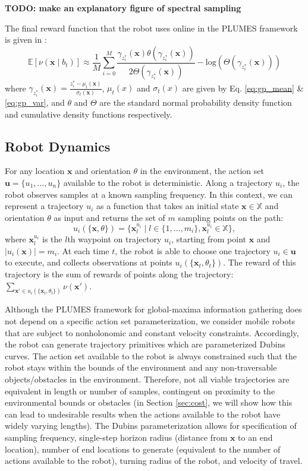 \documentclass{styles/svproc}
\newcommand{\x}{\mathbf{x}}
\newcommand{\U}{\mathbf{u}}
\begin{document}
\textbf{TODO: make an explanatory figure of spectral sampling}

The final reward function that the robot uses online in the PLUMES framework is given in \cite{wang2017max}:
\begin{equation}
    \mathbb{E}[\nu(\x \mid  b_t)] \approx \frac{1}{M} \sum_{i = 0}^M  \frac{\gamma_{z_i^*}(\x) \theta(\gamma_{z_i^*}(\x))}{2 \Theta(\gamma_{z_i^*}(\x))}-\text{log}(\Theta(\gamma_{z_i^*}(\x)))
\end{equation}
where $\gamma_{z_i^*}(\x) = \frac{z_i^* - \mu_t(\x)}{\sigma_t(\x)}$, $\mu_t(x)$ and $\sigma_t(x)$ are given by Eq. \ref{eq:gp_mean} \& \ref{eq:gp_var}, and $\theta$ and $\Theta$ are the standard normal probability density function and cumulative density functions respectively.


\subsection{Robot Dynamics}
\label{sec:planning}
For any location $\x$ and orientation $\theta$ in the environment, the action set $\U = \{u_1, \dots, u_n\}$ available to the robot is deterministic. Along a trajectory $u_i$, the robot observes samples at a known sampling frequency. In this context, we can represent a trajectory $u_i$ as a function that takes an initial state $\x \in \mathbb{X}$ and orientation $\theta$ as input and returns the set of $m$ sampling points on the path:
\begin{equation}
u_i(\{\x, \theta\}) = \{\x_{l}^{u_i} \mid l \in \{1, \dots, m_i\}, \x_{l}^{u_i}  \in \mathbb{X}\},    
\end{equation} 
where $\x_{l}^{u_i}$ is the $l$th waypoint on trajectory $u_i$, starting from point $\x$ and $|u_i(\x)| = m_i$. At each time $t$, the robot is able to choose one trajectory $u_i \in \U$ to execute, and collects observations at points $u_i(\{\x_t, \theta_t\})$. The reward of this trajectory is the sum of rewards of points along the trajectory: $\sum_{\x' \in u_i(\{\x_t, \theta_t\})} \nu(\x')$. %


Although the PLUMES framework for global-maxima information gathering does not depend on a specific action set parameterization, we consider mobile robots that are subject to nonholonomic and constant velocity constraints. Accordingly, the robot can generate trajectory primitives which are parameterized Dubins curves.  The action set available to the robot is always constrained such that the robot stays within the bounds of the environment and any non-traversable objects/obstacles in the environment. Therefore, not all viable trajectories are equivalent in length or number of samples, contingent on proximity to the environmental bounds or obstacles (in Section \ref{sec:cost}, we will show how this can lead to undesirable results when the actions available to the robot have widely varying lengths). The Dubins parameterization allows for specification of sampling frequency, single-step horizon radius (distance from $\x$ to an end location), number of end locations to generate (equivalent to the number of actions available to the robot), turning radius of the robot, and velocity of travel. 
\end{document}
